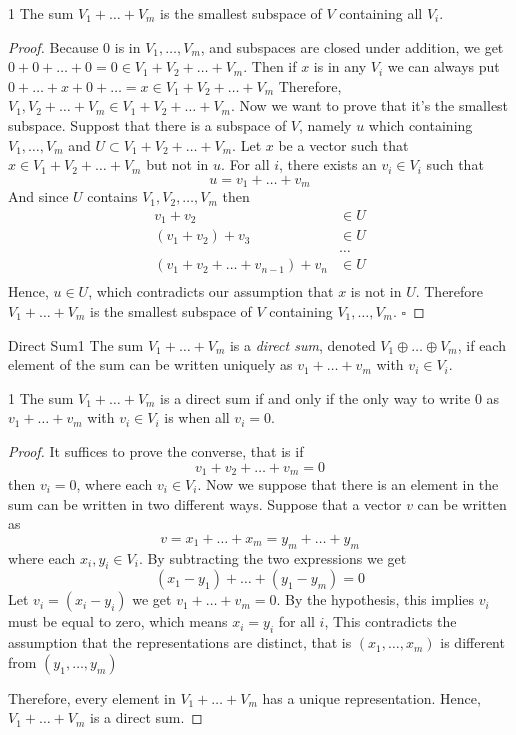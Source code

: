 \documentclass[11pt]{article}
\begin{document}
\begin{theorem}{}{1}
The sum $V_1 + \dots + V_m$ is the smallest subspace of $V$ containing all $V_i$.
\end{theorem}
\begin{proof}
 Because $0$ is in $V_1,\dots,V_m$, and subspaces are closed under addition, we get $0 + 0 +\dots + 0 = 0 \in V_1+V_2+\dots +V_m$. Then if $x$ is in any $V_i$ we can always put $0 + \dots + x + 0 + \dots = x \in V_1 + V_2 + \dots + V_m$
 Therefore, $V_1, V_2 + \dots + V_m \in V_1 + V_2 + \dots + V_m$. Now we want to prove that it's the smallest subspace. Suppost that there is a subspace of $V$, namely $u$ which containing $V_1,\dots,V_m$ and $U \subset V_1 + V_2 + \dots + V_m$. Let $x$ be a vector such that $x \in V_1 + V_2 + \dots + V_m$ but not in $u$. For all $i$, there exists an $v_i \in V_i$ such that
 $$
 	u = v_1 + \dots + v_m
 $$
 And since $U$ contains $V_1, V_2, \dots, V_m$ then
 $$
 	\begin{aligned}
 			v_1 + v_2 &\in U\\
 			(v_1 + v_2) + v_3 &\in U\\
 			&\dots\\
 			(v_1 + v_2 + \dots + v_{n - 1}) + v_n &\in U\\
 	\end{aligned}
 $$
Hence, $u \in U$, which contradicts our assumption that $x$ is not in $U$. Therefore $V_1 + \dots + V_m$ is the smallest subspace of $V$ containing $V_1, \dots, V_m$. $\square$ 
\end{proof}

\begin{definition}{Direct Sum}{1}
The sum $V_1 + \dots + V_m$ is a \textit{direct sum}, denoted $V_1 \oplus \dots \oplus V_m$, if each element of the sum can be written uniquely as $v_1 + \dots + v_m$ with $v_i \in V_i$.
\end{definition}

\begin{theorem}{}{1}
The sum $V_1 + \dots + V_m$ is a direct sum if and only if the only way to write $0$ as $v_1 + \dots + v_m$ with $v_i \in V_i$ is when all $v_i = 0$.
\end{theorem}
\begin{proof}
 It suffices to prove the converse, that is if 
 $$
 	v_1 + v_2 + \dots + v_m = 0
 $$
 then $v_i = 0$, where each $v_i \in V_i$. Now we suppose that there is an element in the sum can be written in two different ways. Suppose that a vector $v$ can be written as
 $$
 v = x_1 + \dots + x_m = y_m + \dots + y_m
 $$
 where each $x_i,y_i \in V_i$. By subtracting the two expressions we get
 $$
 	(x_1 - y_1) +\dots + (y_1 -y_m) = 0
 $$
 Let $v_i = (x_i - y_i)$ we get $v_1 + \dots + v_m = 0$. By the hypothesis, this implies $v_i$ must be equal to zero, which means $x_i = y_i$ for all $i$, This contradicts the assumption that the representations are distinct, that is $(x_1,\dots,x_m)$ is different from $(y_1,\dots,y_m)$
 
 Therefore, every element in $V_1 + \dots + V_m$ has a unique representation. Hence, $V_1 +\dots + V_m$ is a direct sum.
\end{proof}
\end{document}
